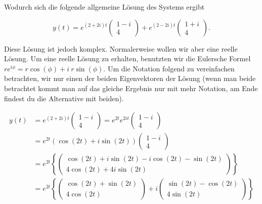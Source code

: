Wodurch sich die folgende allgemeine Lösung des Systems ergibt

\begin{equation*}
    y(t) = e^{(2+2i)t} \begin{pmatrix}
        1-i \\ 4
    \end{pmatrix} + e^{(2-2i)t} \begin{pmatrix}
        1+i \\ 4
    \end{pmatrix}.
\end{equation*}

Diese Lösung ist jedoch komplex. Normalerweise wollen wir aber eine reelle Lösung. Um eine reelle Lösung zu erhalten, benutzten wir die Eulersche Formel \( r e^{i \phi} = r \cos(\phi) + i \ r \sin(\phi) \). Um die Notation folgend zu vereinfachen betrachten, wir nur einen der beiden Eigenvektoren der Lösung (wenn man beide betrachtet kommt man auf das gleiche Ergebnis nur mit mehr Notation, am Ende findest du die Alternative mit beiden). 

\begin{equation*}
    \begin{aligned}
        y(t) &= e^{(2+2i)t} \begin{pmatrix}
            1-i \\ 4
        \end{pmatrix} =
        e^{2t} e^{2it} \begin{pmatrix}
            1-i \\ 4
        \end{pmatrix} \\[0.5em]
        &= e^{2t} \left( \cos(2t) + i \sin(2t) \right) \begin{pmatrix}
            1-i \\ 4
        \end{pmatrix} \\[0.5em]
        &= e^{2t} \left\{ \begin{pmatrix}
            \cos(2t) + i \sin(2t) - i \cos(2t) - \sin(2t) \\
            4 \cos(2t) + 4i \sin(2t)
        \end{pmatrix} \right\} \\[0.5em]
        &= e^{2t} \left\{ \begin{pmatrix}
            \cos(2t) + \sin(2t) \\
            4 \cos(2t)
        \end{pmatrix} + i \begin{pmatrix}
            \sin(2t) - \cos(2t) \\
            4 \sin(2t)
        \end{pmatrix} \right\} 
    \end{aligned}
\end{equation*}

